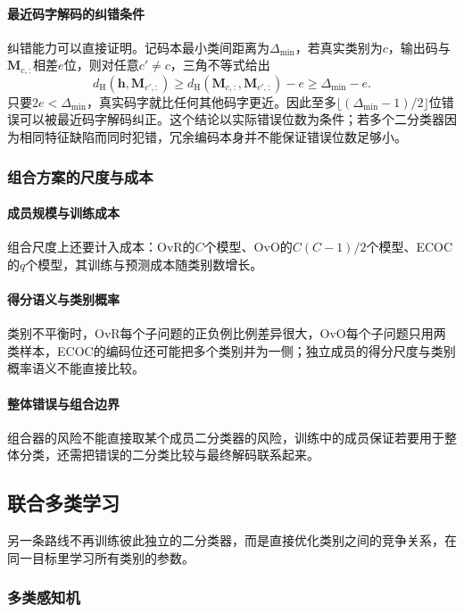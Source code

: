 \paragraph{最近码字解码的纠错条件}
纠错能力可以直接证明。记码本最小类间距离为$\Delta_{\min}$，若真实类别为$c$，输出码与$\bm{M}_{c,:}$相差$e$位，则对任意$c'\ne c$，三角不等式给出
\[
  d_{\mathrm{H}}(\bm{h},\bm{M}_{c',:})
  \ge d_{\mathrm{H}}(\bm{M}_{c,:},\bm{M}_{c',:})-e
  \ge\Delta_{\min}-e.
\]
只要$2e<\Delta_{\min}$，真实码字就比任何其他码字更近。因此至多$\lfloor(\Delta_{\min}-1)/2\rfloor$位错误可以被最近码字解码纠正。这个结论以实际错误位数为条件；若多个二分类器因为相同特征缺陷而同时犯错，冗余编码本身并不能保证错误位数足够小。

\subsubsection{组合方案的尺度与成本}

\paragraph{成员规模与训练成本}
组合尺度上还要计入成本：OvR的$C$个模型、OvO的$C(C-1)/2$个模型、ECOC的$q$个模型，其训练与预测成本随类别数增长。

\paragraph{得分语义与类别概率}
类别不平衡时，OvR每个子问题的正负例比例差异很大，OvO每个子问题只用两类样本，ECOC的编码位还可能把多个类别并为一侧；独立成员的得分尺度与类别概率语义不能直接比较。

\paragraph{整体错误与组合边界}
组合器的风险不能直接取某个成员二分类器的风险，训练中的成员保证若要用于整体分类，还需把错误的二分类比较与最终解码联系起来。

\subsection{联合多类学习}
\label{sec:classification-joint-multiclass}

另一条路线不再训练彼此独立的二分类器，而是直接优化类别之间的竞争关系，在同一目标里学习所有类别的参数。

\subsubsection{多类感知机}
\label{sec:classification-perceptron-multiclass}

